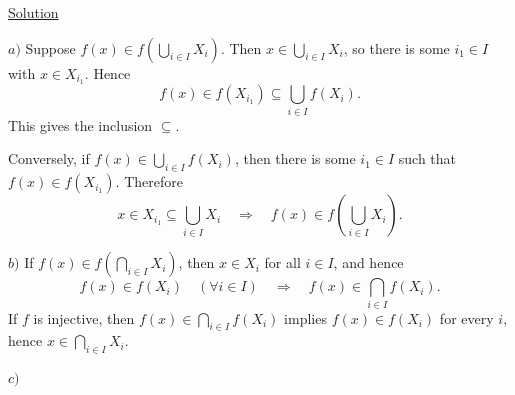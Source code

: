 \medskip
\noindent\underline{Solution}

\noindent $a)$ Suppose
$f(x)\in f\left(\bigcup_{i\in I}X_i\right)$.
Then $x\in\bigcup_{i\in I}X_i$, so there is some $i_1\in I$
with $x\in X_{i_1}$. Hence
\[
 f(x)\in f(X_{i_1})\subseteq\bigcup_{i\in I}f(X_i).
\]
\noindent This gives the inclusion $\subseteq$.

\smallskip
\noindent Conversely, if
$f(x)\in\bigcup_{i\in I}f(X_i)$, then there is some $i_1\in I$
such that $f(x)\in f(X_{i_1})$. Therefore
\[
 x\in X_{i_1}\subseteq\bigcup_{i\in I}X_i
 \quad\Longrightarrow\quad
 f(x)\in f\left(\bigcup_{i\in I}X_i\right).
\]

\medskip
\noindent $b)$ If
$f(x)\in f\left(\bigcap_{i\in I}X_i\right)$, then
$x\in X_i$ for all $i\in I$, and hence
\[
 f(x)\in f(X_i)\quad(\forall i\in I)
 \quad\Longrightarrow\quad
 f(x)\in\bigcap_{i\in I}f(X_i).
\]
\noindent If $f$ is injective, then
$f(x)\in\bigcap_{i\in I}f(X_i)$ implies
$f(x)\in f(X_i)$ for every $i$, hence
$x\in\bigcap_{i\in I}X_i$.

\medskip
\noindent $c)$
